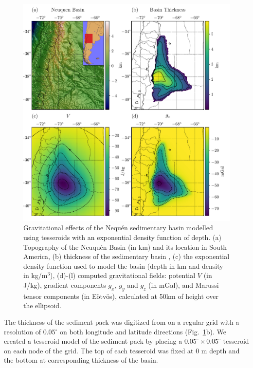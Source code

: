 \documentclass[extra, referee]{gji}
\begin{document}
\begin{figure}
\centering
\includegraphics[width=\linewidth]{figures/neuquen-basin.pdf}
\caption{
    Gravitational effects of the Nequ\'en sedimentary basin modelled
    using tesseroids with an exponential density function of depth.
    (a) Topography of the Neuqu\'en Basin (in km) and its location in South America,
    (b) thickness of the sedimentary basin \citep[in meters;][]{Heine2007},
    (c) the exponential density function used to model the basin
        (depth in km and density in kg/m$^3$),
    (d)-(l) computed gravitational fields: potential $V$ (in J/kg), gradient
    components $g_x$, $g_y$ and $g_z$ (in mGal), and Marussi tensor components
    (in Eötvös), calculated at 50km of height over the ellipsoid.
}
\label{fig:neuquen-basin}
\end{figure}

The thickness of the sediment pack was digitized from \citet{Heine2007} on a regular
grid with a resolution of 0.05$^\circ$ on both longitude and latitude directions
(Fig.~\ref{fig:neuquen-basin}b).
We created a tesseroid model of the sediment pack by placing a
$0.05^\circ \times 0.05^\circ$ tesseroid on each node of the grid.
The top of each tesseroid was fixed at 0 m depth and the bottom at corresponding
thickness of the basin.
\end{document}
